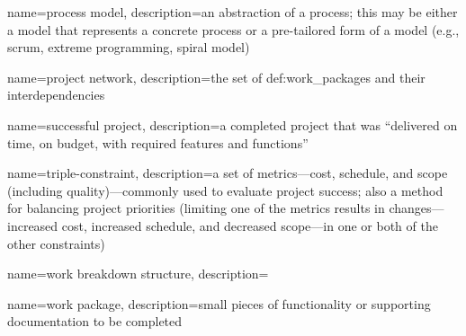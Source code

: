 {
    name={process model},
    description={an abstraction of a process; this may be either a model that
        represents a concrete process or a pre-tailored form of a model (e.g.,
        scrum, extreme programming, spiral model)}
}


{
    name={project network},
    description={the set of \glspl{def:work_package} and their
        interdependencies}
}


{
    name={successful project},
    description={a completed project that was ``delivered on time, on budget,  
        with required features and functions''~\cite[p.1]{_chaos_2013}}
}


{
    name={triple-constraint},
    description={a set of metrics---cost, schedule, and scope (including
        quality)---commonly used to evaluate project success; also a method for
        balancing project priorities (limiting one of the metrics results in
        changes---increased cost, increased schedule, and decreased scope---in
        one or both of the other constraints)} 
}


{
    name={work breakdown structure},
    description={}
}


{
    name={work package},
    description={small pieces of functionality or supporting documentation to be
                 completed}
}





% 
% 
